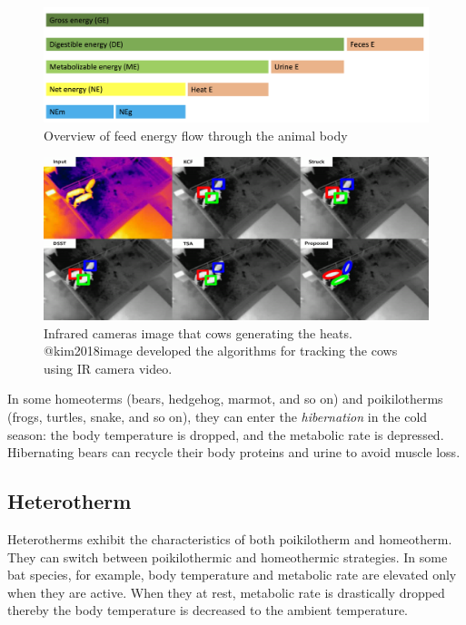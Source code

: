 \documentclass[]{book}
\begin{document}
\begin{figure}

{\centering \includegraphics[width=1\linewidth]{figures/energy-system} 

}

\caption{Overview of feed energy flow through the animal body}\label{fig:e-system}
\end{figure}

\begin{figure}

{\centering \includegraphics[width=1\linewidth]{figures/kimetal} 

}

\caption{Infrared cameras image that cows generating the heats. @kim2018image developed the algorithms for tracking the cows using IR camera video.}\label{fig:kimetal}
\end{figure}

In some homeoterms (bears, hedgehog, marmot, and so on) and
poikilotherms (frogs, turtles, snake, and so on), they can enter the
\emph{hibernation} in the cold season: the body temperature is dropped,
and the metabolic rate is depressed. Hibernating bears can recycle their
body proteins and urine to avoid muscle loss.

\subsection{Heterotherm}\label{heterotherm}

Heterotherms exhibit the characteristics of both poikilotherm and
homeotherm. They can switch between poikilothermic and homeothermic
strategies. In some bat species, for example, body temperature and
metabolic rate are elevated only when they are active. When they at
rest, metabolic rate is drastically dropped thereby the body temperature
is decreased to the ambient temperature.
\end{document}
